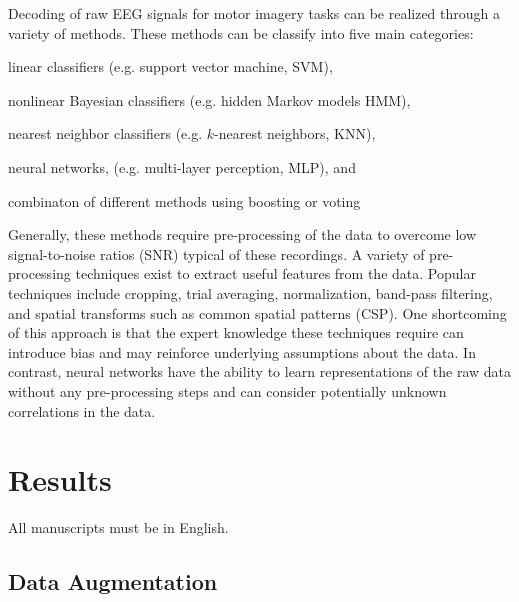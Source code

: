\documentclass[10pt,twocolumn,letterpaper]{article}
\begin{document}
Decoding of raw EEG signals for motor imagery tasks can be realized through a
variety of methods. These methods can be classify into five main categories:
\begin{enumerate*}
    \item linear classifiers (e.g. support vector machine, SVM),
    \item nonlinear Bayesian classifiers (e.g. hidden Markov models HMM),
    \item nearest neighbor classifiers (e.g. $k$-nearest neighbors, KNN),
    \item neural networks, (e.g. multi-layer perception, MLP), and
    \item combinaton of different methods using boosting or voting
\end{enumerate*} %

Generally, these methods require pre-processing of the data to overcome low
signal-to-noise ratios (SNR) typical of these recordings. %
A variety of pre-processing techniques exist to extract useful features from the
data. Popular techniques include cropping, trial averaging, normalization,
band-pass filtering, and spatial transforms such as common spatial patterns
(CSP). One shortcoming of this approach is that the expert knowledge these
techniques require can introduce bias and may reinforce underlying assumptions
about the data. %
In contrast, neural networks have the ability to learn representations of the
raw data without any pre-processing steps and can consider potentially unknown
correlations in the data. %




\section{Results}

All manuscripts must be in English.

\subsection{Data Augmentation}
\end{document}
